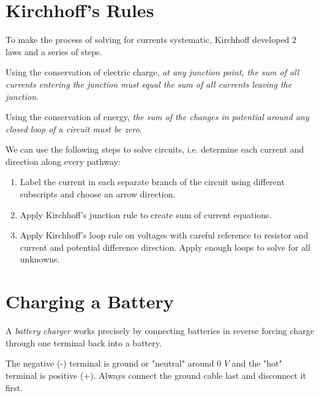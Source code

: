 \section{Kirchhoff's Rules}

\begin{remark}
    To make the process of solving for currents systematic, Kirchhoff developed 2 laws and a series of steps.
\end{remark}
\begin{definition}
    Using the conservation of electric charge, \emph{at any junction point, the sum of all currents entering the junction must equal the sum of all currents leaving the junction}.
\end{definition}
\begin{definition}
    Using the conservation of energy, \emph{the sum of the changes in potential around any closed loop of a circuit must be zero}.
\end{definition}
\begin{remark}
    We can use the following steps to solve circuits, i.e. determine each current and direction along every pathway:
    \begin{enumerate}[label=(Step \arabic*), leftmargin=*]
        \item Label the current in each separate branch of the circuit using different subscripts and choose an arrow direction.
        \item Apply Kirchhoff's junction rule to create sum of current equations.
        \item Apply Kirchhoff's loop rule on voltages with careful reference to resistor and current and potential difference direction. Apply enough loops to solve for all unknowns.
    \end{enumerate}
\end{remark}

\section{Charging a Battery}

\begin{definition}
    A \emph{battery charger} works precisely by connecting batteries in reverse forcing charge through one terminal back into a battery.
\end{definition}
\begin{note}
    The negative (-) terminal is ground or "neutral" around 0 $V$ and the "hot" terminal is positive (+). Always connect the ground cable last and disconnect it first.
\end{note}

